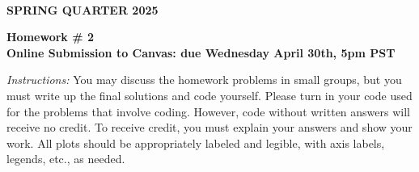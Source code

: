 \documentclass[12pt]{article}
\begin{document}
\\
{\bf SPRING QUARTER 2025}\\


\vspace{5mm}

\begin{center}
{\bf Homework \# 2}\\
{\bf Online Submission to Canvas: due Wednesday April 30th, 5pm PST }
\end{center}
\vspace{10mm}

\noindent \emph{Instructions:} You may discuss the homework problems in small groups, but you must write up the final solutions and code yourself. 
Please turn in your code used for the problems that involve coding. However, code without written answers will receive no credit. To receive credit, you must explain your answers and show your work. All plots should be appropriately labeled and legible, with axis labels, legends, etc., as needed. \\

\vspace{10mm}
\end{document}
